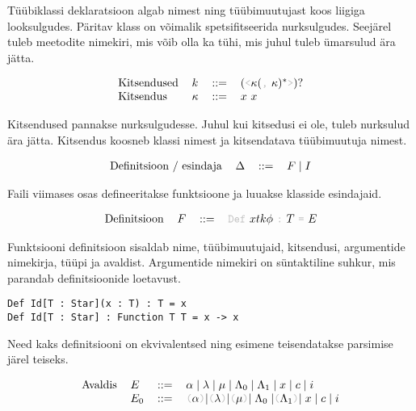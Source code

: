 \documentclass[12pt]{article}
\begin{document}
    Tüübiklassi deklaratsioon algab nimest ning tüübimuutujast koos liigiga looksulgudes. Päritav klass on võimalik spetsifitseerida nurksulgudes. Seejärel tuleb meetodite nimekiri, mis võib olla ka tühi, mis juhul tuleb ümarsulud ära jätta.

    \begin{equation*}
      \begin{tabular}{llll}
        Kitsendused & $k$      & $::=$ & $(${\color{helehall}\verb!<!}$\kappa(${\color{helehall}\verb!,!} $\kappa)^*${\color{helehall}\verb!>!}$)?$ \\
        Kitsendus   & $\kappa$ & $::=$ & $x$ $x$
      \end{tabular}
    \end{equation*}

    Kitsendused pannakse nurksulgudesse. Juhul kui kitsedusi ei ole, tuleb nurksulud ära jätta. Kitsendus koosneb klassi nimest ja kitsendatava tüübimuutuja nimest.

    \begin{equation*}
      \begin{tabular}{llll}
        Definitsioon / esindaja & $\Delta$ & $::=$ & $F\mid I$
      \end{tabular}
    \end{equation*}

    Faili viimases osas defineeritakse funktsioone ja luuakse klasside esindajaid.

    \begin{equation*}
      \begin{tabular}{llll}
        Definitsioon & $F$ & $::=$ & {\color{helehall}\verb!Def!} $xtk\phi$ {\color{helehall}\verb!:!} $T$ {\color{helehall}\verb!=!} $E$
      \end{tabular}
    \end{equation*}

    Funktsiooni definitsioon sisaldab nime, tüübimuutujaid, kitsendusi, argumentide nimekirja, tüüpi ja avaldist. Argumentide nimekiri on süntaktiline suhkur, mis parandab definitsioonide loetavust.

    \begin{verbatim}Def Id[T : Star](x : T) : T = x
Def Id[T : Star] : Function T T = x -> x\end{verbatim}

    Need kaks definitsiooni on ekvivalentsed ning esimene teisendatakse parsimise järel teiseks.

    \begin{equation*}
      \begin{tabular}{llll}
        Avaldis & $E$   & $::=$ & $\alpha\mid\lambda\mid\mu\mid\Lambda_0\mid\Lambda_1\mid x\mid c\mid i$ \\
                & $E_0$ & $::=$ & {\color{helehall}\verb!(!}$\alpha${\color{helehall}\verb!)!}$\mid${\color{helehall}\verb!(!}$\lambda${\color{helehall}\verb!)!}$\mid${\color{helehall}\verb!(!}$\mu${\color{helehall}\verb!)!}$\mid\Lambda_0\mid${\color{helehall}\verb!(!}$\Lambda_1${\color{helehall}\verb!)!}$\mid x\mid c\mid i$
      \end{tabular}
    \end{equation*}
\end{document}
